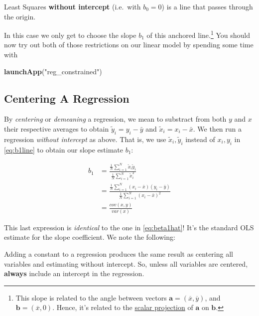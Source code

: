 \documentclass[]{book}
\newenvironment{Shaded}{\begin{snugshade}}{\end{snugshade}}
\newcommand{\KeywordTok}[1]{\textcolor[rgb]{0.13,0.29,0.53}{\textbf{#1}}}
\newcommand{\StringTok}[1]{\textcolor[rgb]{0.31,0.60,0.02}{#1}}
\newcommand{\NormalTok}[1]{#1}
\newenvironment{tip}{\begin{tcolorbox}[colback=green!5!white,colframe=green]}{\end{tcolorbox}}
\begin{document}
\begin{tip}
Least Squares \textbf{without intercept} (i.e.~with \(b_0=0\)) is a line
that passes through the origin.
\end{tip}

In this case we only get to choose the slope \(b_1\) of this anchored
line.\footnote{This slope is related to the angle between vectors
  \(\mathbf{a} = (\overline{x},\overline{y})\), and
  \(\mathbf{b} = (\overline{x},0)\). Hence, it's related to the
  \href{https://en.wikipedia.org/wiki/Scalar_projection}{scalar
  projection} of \(\mathbf{a}\) on \(\mathbf{b}\).} You should now try
out both of those restrictions on our linear model by spending some time
with

\begin{Shaded}
\begin{Highlighting}[]
\KeywordTok{launchApp}\NormalTok{(}\StringTok{"reg_constrained"}\NormalTok{)}
\end{Highlighting}
\end{Shaded}

\subsection{Centering A Regression}\label{centering-a-regression}

By \emph{centering} or \emph{demeaning} a regression, we mean to
substract from both \(y\) and \(x\) their respective averages to obtain
\(\tilde{y}_i = y_i - \bar{y}\) and \(\tilde{x}_i = x_i - \bar{x}\). We
then run a regression \emph{without intercept} as above. That is, we use
\(\tilde{x}_i,\tilde{y}_i\) instead of \(x_i,y_i\) in \eqref{eq:b1line} to
obtain our slope estimate \(b_1\):

\begin{align}
b_1 &= \frac{\frac{1}{N}\sum_{i=1}^N \tilde{x}_i \tilde{y}_i}{\frac{1}{N}\sum_{i=1}^N \tilde{x}_i^2}\\
    &= \frac{\frac{1}{N}\sum_{i=1}^N (x_i - \bar{x}) (y_i - \bar{y})}{\frac{1}{N}\sum_{i=1}^N (x_i - \bar{x})^2} \\
    &= \frac{cov(x,y)}{var(x)}
    \label{eq:bline-centered}
\end{align}

This last expression is \emph{identical} to the one in
\eqref{eq:beta1hat}! It's the standard OLS estimate for the slope
coefficient. We note the following:

\begin{tip}
Adding a constant to a regression produces the same result as centering
all variables and estimating without intercept. So, unless all variables
are centered, \textbf{always} include an intercept in the regression.
\end{tip}
\end{document}
